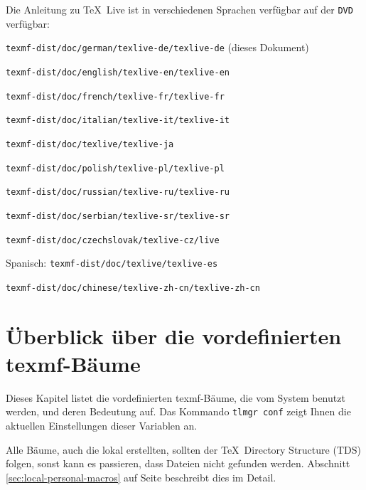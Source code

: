 \documentclass[12pt,ngerman,a4paper,fullparskip]{scrreprt}
\newcommand{\TL}{\TeX\ Live\xspace}
\newcommand{\acro}[1]{\texttt{#1}}
\newcommand{\OnCD}[1]{\texttt{#1}}
\providecommand*{\DVD}{\acro{DVD}\xspace}
\begin{document}
Die Anleitung zu \TL ist in verschiedenen Sprachen verfügbar auf der \DVD verfügbar:
\begin{description}
\item[Deutsch:]                \OnCD{texmf-dist/doc/german/texlive-de/texlive-de} (dieses Dokument)
\item[Englisch:]               \OnCD{texmf-dist/doc/english/texlive-en/texlive-en}
\item[Französisch:]            \OnCD{texmf-dist/doc/french/texlive-fr/texlive-fr}
\item[Italienisch:]              \OnCD{texmf-dist/doc/italian/texlive-it/texlive-it}
\item[Japanisch:]  					\OnCD{texmf-dist/doc/texlive/texlive-ja}
\item[Polnisch:]               \OnCD{texmf-dist/doc/polish/texlive-pl/texlive-pl}
\item[Russisch:]               \OnCD{texmf-dist/doc/russian/texlive-ru/texlive-ru}
\item[Serbisch:]               \OnCD{texmf-dist/doc/serbian/texlive-sr/texlive-sr}
\item[Tschechisch/Slowakisch:] \OnCD{texmf-dist/doc/czechslovak/texlive-cz/live}
\item{Spanisch:} \OnCD{texmf-dist/doc/texlive/texlive-es}
\item[Chinesisch:]             \OnCD{texmf-dist/doc/chinese/texlive-zh-cn/texlive-zh-cn}
\end{description}

\section{Überblick über die vordefinierten texmf-Bäume}\label{sec:texmftrees}

Dieses Kapitel listet die vordefinierten texmf-Bäume, die vom System benutzt
werden, und deren Bedeutung auf. Das Kommando \texttt{tlmgr~conf}
zeigt Ihnen die aktuellen Einstellungen dieser Variablen an.

Alle Bäume, auch die lokal erstellten, sollten der \TeX\ Directory Structure (TDS) folgen, sonst kann es passieren, dass Dateien nicht gefunden werden. Abschnitt \ref{sec:local-personal-macros} auf Seite \pageref{sec:local-personal-macros} beschreibt dies im Detail.
\end{document}
